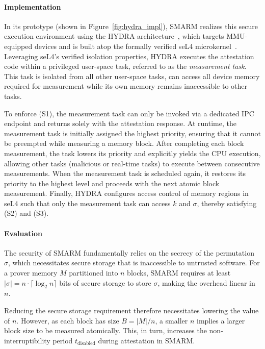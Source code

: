 \documentclass{ieeeaccess}
\begin{document}
\paragraph{\textbf{Implementation}}
In its prototype (shown in Figure~\ref{fig:hydra_impl}), SMARM realizes this secure execution environment using the HYDRA architecture~\cite{hydra}, which targets MMU-equipped devices and is built atop the formally verified seL4 microkernel~\cite{sel4}.
Leveraging seL4's verified isolation properties, HYDRA executes the attestation code within a privileged user-space task, referred to as the \emph{measurement task}.
This task is isolated from all other user-space tasks, can access all device memory required for measurement while its own memory remains inaccessible to other tasks.

To enforce (S1), the measurement task can only be invoked via a dedicated IPC endpoint and returns solely with the attestation response.
At runtime, the measurement task is initially assigned the highest priority, ensuring that it cannot be preempted while measuring a memory block.
After completing each block measurement, the task lowers its priority and explicitly yields the CPU execution, allowing other tasks (malicious or real-time tasks) to execute between consecutive measurements.
When the measurement task is scheduled again, it restores its priority to the highest level and proceeds with the next atomic block measurement.
%
Finally, HYDRA configures access control of memory regions in seL4 such that only the measurement task can access $k$ and $\sigma$, thereby satisfying (S2) and (S3).

\paragraph{\textbf{Evaluation}}
The security of SMARM fundamentally relies on the secrecy of the permutation~$\sigma$, which necessitates secure storage that is inaccessible to untrusted software.
For a prover memory $M$ partitioned into $n$ blocks, SMARM requires at least
$|\sigma| = n \cdot \lceil \log_2 n \rceil$ bits of secure storage to store $\sigma$, making the overhead linear in~$n$.

Reducing the secure storage requirement therefore necessitates lowering the value of $n$.
However, as each block has size $B = |M|/n$, a smaller $n$ implies a larger block size to be measured atomically.
This, in turn, increases the non-interruptibility period $t_{\text{disabled}}$ during attestation in SMARM.
\end{document}

